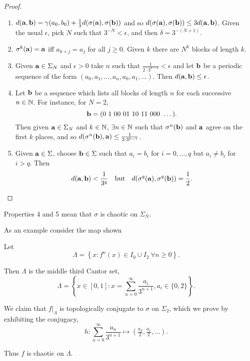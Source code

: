 \documentclass{notes}
\theoremstyle{plain}
\begin{document}
\begin{proof}\hfill
  \begin{enumerate}
  \item $d(\mathbf{a},\mathbf{b}) = \gamma(a_0,b_0) + \tfrac{1}{3}
    d(\sigma(\mathbf{a}),\sigma(\mathbf{b}))$ and so $d(\sigma(\mathbf{a}),\sigma(\mathbf{b})) \le
    3 d(\mathbf{a},\mathbf{b})$.  Given the usual $\epsilon$, pick $N$ such that
    $3^{-N} < \epsilon$, and then $\delta = 3^{-(N+1)}$.
  \item $\sigma^k(\mathbf{a}) = \mathbf{a}$ iff $a_{k+j} = a_j$ for all $j \ge 0$.  Given
    $k$ there are $N^k$ blocks of length $k$.
  \item Given $\mathbf{a} \in \Sigma_N$ and $\epsilon > 0$ take $n$ such that
    $\tfrac{1}{2 \cdot 3^{n-1}} < \epsilon$ and let $\mathbf{b}$ be a periodic
    sequence of the form $(a_0,a_1,\dots,a_n,a_0,a_1,\dots)$.  Then
    $d(\mathbf{a},\mathbf{b}) \le \epsilon$.
  \item Let $\mathbf{b}$ be a sequence which lists all blocks of length $n$ for each
    successive $n \in \mathbb{N}$.  For instance, for $N = 2$,
    \[
    \b = (0\ 1\ 00\ 01\ 10\ 11\ 000\ \dots).
    \]
    Then given $\mathbf{a} \in \Sigma_N$ and $k \in \mathbb{N}$, $\exists n \in \mathbb{N}$ such
    that $\sigma^n(\mathbf{b})$ and $\mathbf{a}$ agree on the first $k$ places, and so
    $d(\sigma^n(\mathbf{b}),\mathbf{a}) \le \tfrac{1}{2 \cdot 3^{k-1}}$.
  \item Given $\mathbf{a} \in \Sigma$, choose $\mathbf{b} \in \Sigma$ such that
    $a_i = b_i$ for $i=0,\dots,q$ but $a_i \neq b_i$ for $i > q$.  Then
    \[
    d(\mathbf{a},\mathbf{b}) < \frac{1}{3^q} \quad \text{but} \quad d(\sigma^q(\mathbf{a}),
    \sigma^q(\mathbf{b})) = \frac{1}{2}.
    \]
  \end{enumerate}
\end{proof}

Properties 4 and 5 mean that $\sigma$ is chaotic on $\Sigma_N$.

As an example consider the map shown

\vspace{1.5in}

Let
\[
\Lambda = \left\{x : f^n(x) \in I_0 \cup I_2\ \forall n \ge 0 \right\}.
\]

Then $\Lambda$ is the middle third Cantor set,
\[
\Lambda = \left\{ x \in [0,1] : x = \sum_{n=0}^\infty \frac{a_i}{3^{n+1}},
a_i \in \{0,2\}\right\}.
\]

We claim that $\left.f\right|_\Lambda$ is topologically conjugate to
$\sigma$ on $\Sigma_2$, which we prove by exhibiting the conjugacy,
\[
h \colon \sum_{n=0}^\infty \frac{a_n}{3^{n+1}} \mapsto (\tfrac{a_0}{2},
\tfrac{a_1}{2},\dots).
\]

Thus $f$ is chaotic on $\Lambda$.
\end{document}
